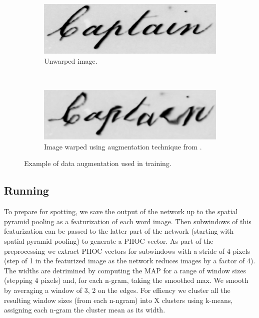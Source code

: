\documentclass[ms,electronic,twosidetoc,letterpaper,chaptercenter,parttop,lol,lof,lot]{byumsphd}
\begin{document}
\begin{figure}
    \centering
    \begin{subfigure}[t]{0.46\textwidth}
    		\centering
    		\includegraphics[width=\textwidth]{Captain_unwarped}
    		\caption{Unwarped image.}
    	\end{subfigure}
    	~
    	\begin{subfigure}[t]{0.46\textwidth}
    		\centering
    		\includegraphics[width=\textwidth]{Captain_warped}
    		\caption{Image warped using augmentation technique from \cite{wigington2017}.}
    	\end{subfigure}
    	\caption{Example of data augmentation used in training.}
    	\label{fig:augmentation}
\end{figure}


\subsection{Running}

To prepare for spotting, we save the output of the network up to the spatial pyramid pooling as a featurization of each word image. Then subwindows of this featurization can be passed to the latter part of the network (starting with spatial pyramid pooling) to generate a PHOC vector. As part of the preprocessing we extract PHOC vectors for subwindows with a stride of 4 pixels (step of 1 in the featurized image as the network reduces images by a factor of 4).
The widths are detrimined by computing the MAP for a range of window sizes (stepping 4 pixels) and, for each n-gram, taking the smoothed max. We smooth by averaging a window of 3, 2 on the edges. For effiency we cluster all the resulting window sizes (from each n-ngram) into X clusters using k-means, assigning each n-gram the cluster mean as its width.
\end{document}
